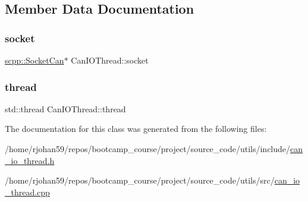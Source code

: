 \subsection{Member Data Documentation}
\mbox{\label{classCanIOThread_a4c0f06e7c73ea3afcb567ff7dbb41f30}} 
\subsubsection{\texorpdfstring{socket}{socket}}
{\footnotesize\ttfamily \hyperlink{classscpp_1_1SocketCan}{scpp\+::\+Socket\+Can}$\ast$ Can\+I\+O\+Thread\+::socket\hspace{0.3cm}{\ttfamily [private]}}

\mbox{\label{classCanIOThread_a7a0b5ee8f944e3e94d529311f064c1ac}} 
\subsubsection{\texorpdfstring{thread}{thread}}
{\footnotesize\ttfamily std\+::thread Can\+I\+O\+Thread\+::thread\hspace{0.3cm}{\ttfamily [private]}}



The documentation for this class was generated from the following files\+:\begin{DoxyCompactItemize}
\item 
/home/rjohan59/repos/bootcamp\+\_\+course/project/source\+\_\+code/utils/include/\hyperlink{can__io__thread_8h}{can\+\_\+io\+\_\+thread.\+h}\item 
/home/rjohan59/repos/bootcamp\+\_\+course/project/source\+\_\+code/utils/src/\hyperlink{can__io__thread_8cpp}{can\+\_\+io\+\_\+thread.\+cpp}\end{DoxyCompactItemize}
